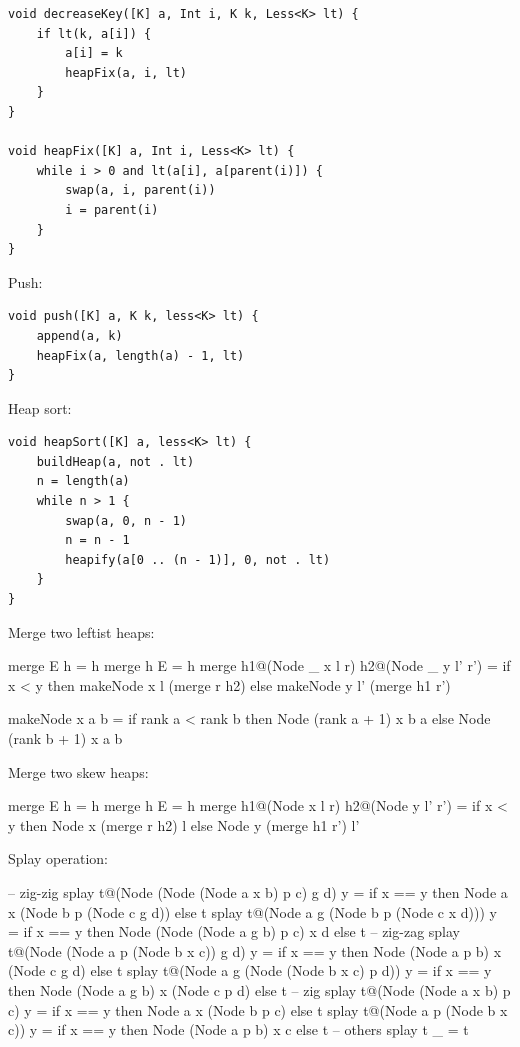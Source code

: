 \documentclass[b5paper]{article}
\begin{document}
\begin{lstlisting}[language = Bourbaki]
void decreaseKey([K] a, Int i, K k, Less<K> lt) {
    if lt(k, a[i]) {
        a[i] = k
        heapFix(a, i, lt)
    }
}

void heapFix([K] a, Int i, Less<K> lt) {
    while i > 0 and lt(a[i], a[parent(i)]) {
        swap(a, i, parent(i))
        i = parent(i)
    }
}
\end{lstlisting}

Push:

\begin{lstlisting}[language = Bourbaki]
void push([K] a, K k, less<K> lt) {
    append(a, k)
    heapFix(a, length(a) - 1, lt)
}
\end{lstlisting}

Heap sort:

\begin{lstlisting}[language = Bourbaki]
void heapSort([K] a, less<K> lt) {
    buildHeap(a, not . lt)
    n = length(a)
    while n > 1 {
        swap(a, 0, n - 1)
        n = n - 1
        heapify(a[0 .. (n - 1)], 0, not . lt)
    }
}
\end{lstlisting}

Merge two leftist heaps:

\begin{Haskell}
merge E h = h
merge h E = h
merge h1@(Node _ x l r) h2@(Node _ y l' r') =
    if x < y then makeNode x l (merge r h2)
    else makeNode y l' (merge h1 r')

makeNode x a b = if rank a < rank b then Node (rank a + 1) x b a
                 else Node (rank b + 1) x a b
\end{Haskell}

Merge two skew heaps:

\begin{Haskell}
merge E h = h
merge h E = h
merge h1@(Node x l r) h2@(Node y l' r') =
    if x < y then Node x (merge r h2) l
    else Node y (merge h1 r') l'
\end{Haskell}

Splay operation:

\begin{Haskell}
-- zig-zig
splay t@(Node (Node (Node a x b) p c) g d) y =
    if x == y then Node a x (Node b p (Node c g d)) else t
splay t@(Node a g (Node b p (Node c x d))) y =
    if x == y then Node (Node (Node a g b) p c) x d else t
-- zig-zag
splay t@(Node (Node a p (Node b x c)) g d) y =
    if x == y then Node (Node a p b) x (Node c g d) else t
splay t@(Node a g (Node (Node b x c) p d)) y =
    if x == y then Node (Node a g b) x (Node c p d) else t
-- zig
splay t@(Node (Node a x b) p c) y = if x == y then Node a x (Node b p c) else t
splay t@(Node a p (Node b x c)) y = if x == y then Node (Node a p b) x c else t
-- others
splay t _ = t
\end{Haskell}
\end{document}
